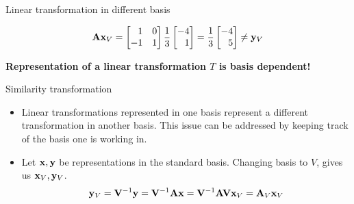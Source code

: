 \documentclass[aspectratio=169]{beamer}
\let\olditem\item
\renewcommand{\item}{\setlength{\itemsep}{\fill}\olditem}
\def\mf{\ensuremath\mathbf}
\begin{document}
\begin{frame}[t]{Linear transformation in different basis}
\begin{small}
\[ \mf{A}\mf{x}_V = \begin{bmatrix*}[r]1 & 0\\-1 & 1\end{bmatrix*}\frac{1}{3}\begin{bmatrix*}[r]-4\\1\end{bmatrix*} = \frac{1}{3}\begin{bmatrix*}[r]-4\\5\end{bmatrix*} \neq \mf{y}_V \]

\textbf{Representation of a linear transformation $T$ is basis dependent! }
\end{small}

\end{frame}


\begin{frame}[t]{Similarity transformation}
\begin{itemize}
    \item Linear transformations represented in one basis represent a different transformation in another basis. This issue can be addressed by keeping track of the basis one is working in.

    \item Let $\mf{x}, \mf{y}$ be representations in the standard basis. Changing basis to $V$, gives us $\mf{x}_V, \mf{y}_V$.
    \[ \mf{y}_V = \mf{V}^{-1}\mf{y} = \mf{V}^{-1}\mf{Ax} = \mf{V}^{-1}\mf{A}\mf{V}\mf{x}_V = \mf{A}_V\mf{x}_V \]
\end{itemize}
\end{frame}



\end{document}
